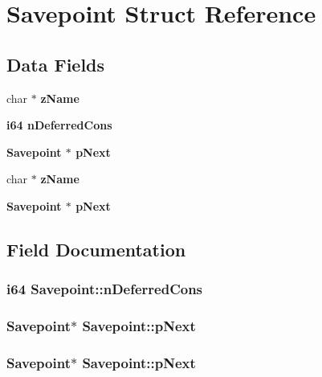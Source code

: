\section{Savepoint Struct Reference}
\label{structSavepoint}
\subsection*{Data Fields}
\begin{CompactItemize}
\item 
char $\ast$ \bf{z\-Name}
\item 
\bf{i64} \bf{n\-Deferred\-Cons}
\item 
\bf{Savepoint} $\ast$ \bf{p\-Next}
\item 
char $\ast$ \bf{z\-Name}
\item 
\bf{Savepoint} $\ast$ \bf{p\-Next}
\end{CompactItemize}


\subsection{Field Documentation}
\subsubsection{\setlength{\rightskip}{0pt plus 5cm}\bf{i64} \bf{Savepoint::n\-Deferred\-Cons}}\label{structSavepoint_f712fae968d88697ffffaecc0e44934c}


\subsubsection{\setlength{\rightskip}{0pt plus 5cm}\bf{Savepoint}$\ast$ \bf{Savepoint::p\-Next}}\label{structSavepoint_b295b07beaa83fbd551ecd9e3a037d22}


\subsubsection{\setlength{\rightskip}{0pt plus 5cm}\bf{Savepoint}$\ast$ \bf{Savepoint::p\-Next}}\label{structSavepoint_b295b07beaa83fbd551ecd9e3a037d22}



